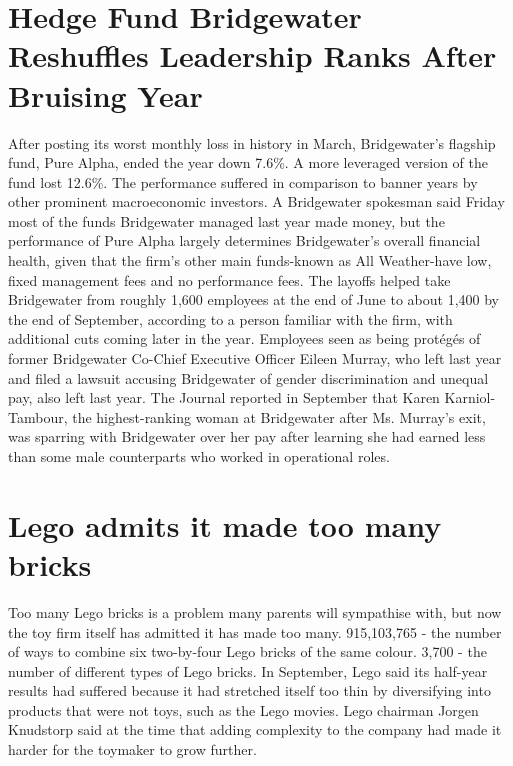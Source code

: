 \documentclass{article}
\begin{document}
            

\section{Hedge Fund Bridgewater Reshuffles Leadership Ranks After Bruising Year}
After posting its worst monthly loss in history in March, Bridgewater's flagship fund, Pure Alpha, ended the year down 7.6\%. A more leveraged version of the fund lost 12.6\%. The performance suffered in comparison to banner years by other prominent macroeconomic investors. A Bridgewater spokesman said Friday most of the funds Bridgewater managed last year made money, but the performance of Pure Alpha largely determines Bridgewater's overall financial health, given that the firm's other main funds-known as All Weather-have low, fixed management fees and no performance fees. The layoffs helped take Bridgewater from roughly 1,600 employees at the end of June to about 1,400 by the end of September, according to a person familiar with the firm, with additional cuts coming later in the year. Employees seen as being protégés of former Bridgewater Co-Chief Executive Officer Eileen Murray, who left last year and filed a lawsuit accusing Bridgewater of gender discrimination and unequal pay, also left last year. The Journal reported in September that Karen Karniol-Tambour, the highest-ranking woman at Bridgewater after Ms. Murray's exit, was sparring with Bridgewater over her pay after learning she had earned less than some male counterparts who worked in operational roles.

\section{Lego admits it made too many bricks}
Too many Lego bricks is a problem many parents will sympathise with, but now the toy firm itself has admitted it has made too many. 915,103,765 - the number of ways to combine six two-by-four Lego bricks of the same colour. 3,700 - the number of different types of Lego bricks. In September, Lego said its half-year results had suffered because it had stretched itself too thin by diversifying into products that were not toys, such as the Lego movies. Lego chairman Jorgen Knudstorp said at the time that adding complexity to the company had made it harder for the toymaker to grow further.
\end{document}
